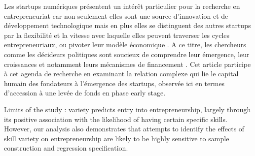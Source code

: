 \documentclass[12pt]{article}
\begin{document}
Les startups numériques présentent un intérêt particulier pour la recherche en entrepreneuriat car non seulement elles sont une source d'innovation et de développement technologique mais en plus elles se distinguent des autres startups par la flexibilité et la vitesse avec laquelle elles peuvent traverser les cycles entrepreneuriaux, ou pivoter leur modèle économique \citep{nambisan2017digital}. A ce titre, les chercheurs comme les décideurs politiques sont soucieux de comprendre leur émergence, leur croissances et notamment leurs mécanismes de financement \citep{klein2020start}. Cet article participe à cet agenda de recherche en examinant la relation complexe qui lie le capital humain des fondateurs à l'émergence des startups, observée ici en termes d'accession à une levée de fonds en phase early stage.

Limits of the study : variety predicts entry into entrepreneurship, largely through its positive association with the likelihood of having certain specific skills. However, our analysis also demonstrates that attempts to identify the effects of skill variety on entrepreneurship are likely to be highly sensitive to sample construction and regression specification. %




\end{document}
